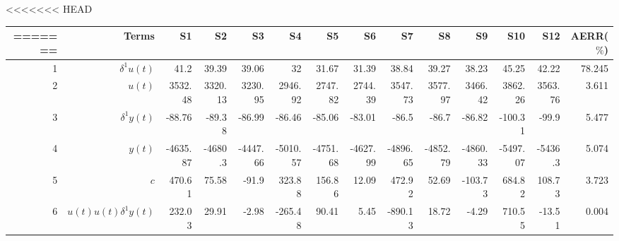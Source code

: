 <<<<<<< HEAD
\begin{tabular}{rrrrrrrrrrrrrr}
=======
\begin{tabular}{llllllllllllll}
>>>>>>> master
Step & Terms & S1 & S2 & S3 & S4 & S5 & S6 & S7 & S8 & S9 & S10 & S12 & AERR($\%$) \\ 
\hline 
1 & $\delta^1 u(t)$ & 41.2 & 39.39 & 39.06 & 32 & 31.67 & 31.39 & 38.84 & 39.27 & 38.23 & 45.25 & 42.22 & 78.245 \\ 
2 & $u(t)$ & 3532.48 & 3320.13 & 3230.95 & 2946.92 & 2747.82 & 2744.39 & 3547.73 & 3577.97 & 3466.42 & 3862.26 & 3563.76 & 3.611 \\ 
3 & $\delta^1 y(t)$ & -88.76 & -89.38 & -86.99 & -86.46 & -85.06 & -83.01 & -86.5 & -86.7 & -86.82 & -100.31 & -99.9 & 5.477 \\ 
4 & $y(t)$ & -4635.87 & -4680.3 & -4447.66 & -5010.57 & -4751.68 & -4627.99 & -4896.65 & -4852.79 & -4860.33 & -5497.07 & -5436.3 & 5.074 \\ 
5 & $c$ & 470.61 & 75.58 & -91.9 & 323.88 & 156.86 & 12.09 & 472.92 & 52.69 & -103.73 & 684.82 & 108.73 & 3.723 \\ 
6 & $u(t)u(t)\delta^1 y(t)$ & 232.03 & 29.91 & -2.98 & -265.48 & 90.41 & 5.45 & -890.13 & 18.72 & -4.29 & 710.55 & -13.51 & 0.004 \\ 
\hline 
\end{tabular}